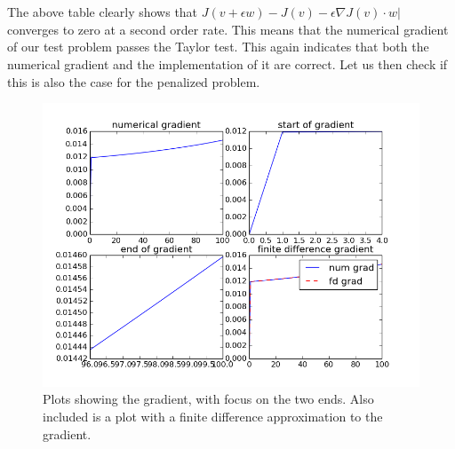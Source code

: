 \\
\\
The above table clearly shows that $J(v+\epsilon w)-J(v)-\epsilon \nabla J(v)\cdot w|$ converges to zero at a second order rate. This means that the numerical gradient of our test problem passes the Taylor test. This again indicates that both the numerical gradient and the implementation of it are correct. Let us then check if this is also the case for the penalized problem.
\begin{figure}[h]
\caption{Plots showing the gradient, with focus on the two ends. Also included is a plot with a finite difference approximation to the gradient.}
\centering
\includegraphics[scale=0.5]{num_grad.png}
\end{figure}
